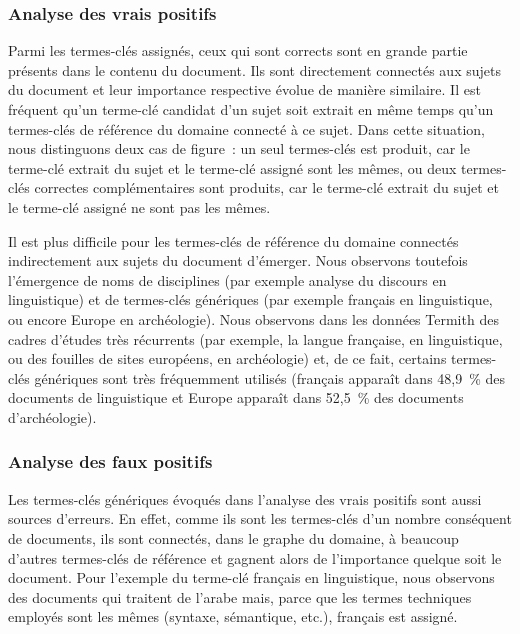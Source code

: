       \subsubsection{Analyse des vrais positifs}
      \label{subsec:main-domain_specific_keyphrase_annotation-supervised_automatic_keyphrase_annotation-error_analysis-true_positives}
        Parmi les termes-clés assignés, ceux qui sont corrects sont en grande 
        partie présents dans le contenu du document. Ils sont directement
        connectés aux sujets du document et leur importance respective évolue de
        manière similaire. Il est fréquent qu'un terme-clé candidat d'un sujet
        soit extrait en même temps qu'un termes-clés de référence du domaine
        connecté à ce sujet. Dans cette situation, nous distinguons deux cas de
        figure~: un seul termes-clés est produit, car le terme-clé extrait du
        sujet et le terme-clé assigné sont les mêmes, ou deux termes-clés
        correctes complémentaires sont produits, car le terme-clé extrait du
        sujet et le terme-clé assigné ne sont pas les mêmes.
        
        Il est plus difficile pour les termes-clés de référence du domaine
        connectés indirectement aux sujets du document d'émerger. Nous observons
        toutefois l'émergence de noms de disciplines (par exemple \og{}analyse
        du discours\fg{} en linguistique) et de termes-clés génériques (par
        exemple \og{}français\fg{} en linguistique, ou encore \og{}Europe\fg{}
        en archéologie). Nous observons dans les données Termith des cadres
        d'études très récurrents (par exemple, la langue française, en
        linguistique, ou des fouilles de sites européens, en archéologie) et, de
        ce fait, certains termes-clés génériques sont très fréquemment utilisés
        (\og{}français\fg{} apparaît dans 48,9~\% des documents de linguistique
        et \og{}Europe\fg{} apparaît dans 52,5~\% des documents d'archéologie).

      \subsubsection{Analyse des faux positifs}
      \label{subsec:main-domain_specific_keyphrase_annotation-supervised_automatic_keyphrase_annotation-error_analysis-false_positives}
        Les termes-clés génériques évoqués dans l'analyse des vrais positifs
        sont aussi sources d'erreurs. En effet, comme ils sont les termes-clés
        d'un nombre conséquent de documents, ils sont connectés, dans le graphe
        du domaine, à beaucoup d'autres termes-clés de référence et gagnent
        alors de l'importance quelque soit le document. Pour l'exemple du
        terme-clé \og{}français\fg{} en linguistique, nous observons des
        documents qui traitent de l'arabe mais, parce que les termes techniques
        employés sont les mêmes (\og{}syntaxe\fg{}, \og{}sémantique\fg{}, etc.),
        \og{}français\fg{} est assigné.

